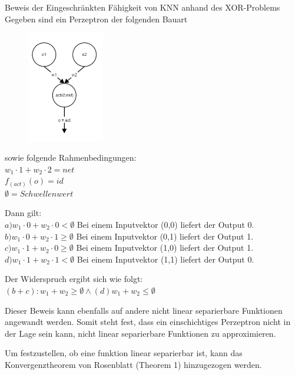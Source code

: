 \begin{bew}Beweis der Eingeschränkten Fähigkeit von KNN anhand des XOR-Problems\\

Gegeben sind ein Perzeptron der folgenden Bauart

\begin{figure}[H]
\centering
		\includegraphics[width=0.30\textwidth]{Perzeptron.PNG}
\end{figure}

sowie folgende Rahmenbedingungen:\\
$w_1\cdot1 + w_2\cdot2 = net$\\ 
$f_(act)(o) = id$ \\
$\emptyset = Schwellenwert$

Dann gilt:\\
$a) w_1\cdot 0 + w_2\cdot 0 < \emptyset$ Bei einem Inputvektor (0,0) liefert der Output 0.\\
$b) w_1\cdot 0 + w_2\cdot 1 \geq \emptyset$ Bei einem Inputvektor (0,1) liefert der Output 1.\\
$c) w_1\cdot 1 + w_2\cdot 0 \geq \emptyset$ Bei einem Inputvektor (1,0) liefert der Output 1.\\
$d) w_1\cdot 1 + w_2\cdot 1 < \emptyset$ Bei einem Inputvektor (1,1) liefert der Output 0.

Der Widerspruch ergibt sich wie folgt:\\ $(b+c):  w_1 + w_2 \geq \emptyset  \wedge (d)  w_1 + w_2 \leq \emptyset$
\end{bew}

Dieser Beweis kann ebenfalls auf andere nicht linear separierbare Funktionen angewandt werden. Somit steht fest, dass ein einschichtiges Perzeptron nicht in der Lage sein kann, nicht linear separierbare Funktionen zu approximieren.

Um festzustellen, ob eine funktion linear separierbar ist, kann das Konvergenztheorem von Rosenblatt (Theorem 1) hinzugezogen werden.

